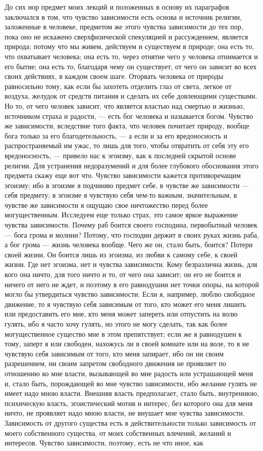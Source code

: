 \documentclass[12pt]{article}
\begin{document}
До сих нор предмет моих лекций и положенных в основу их параграфов заключался в том, что чувство зависимости есть основа и источник религии, заложенные в человеке, предметом же этого чувства зависимости до тех пор, пока оно не искажено сверхфизической спекуляцией и рассуждением, является природа; потому что мы живем, действуем и существуем в природе; она есть то, что охватывает человека; она есть то, через отнятие чего у человека отнимается и его бытие; она есть то, благодаря чему он существует, от чего он зависит во всех своих действиях, в каждом своем шаге. Оторвать человека от природы равносильно тому, как если бы захотеть отделить глаз от света, легкое от воздуха, желудок от средств питания и сделать их себе довлеющими существами. Но то, от чего человек зависит, что  является властью над смертью и жизнью, источником страха и радости, --- есть бог человека и называется богом. Чувство же зависимости, вследствие того факта, что человек почитает природу, вообще бога только за его благодетельность, --- а если и за его вредоносность и распространяемый им ужас, то лишь для того, чтобы отвратить от себя эту его вредоносность, --- привело нас к эгоизму, как к последней скрытой основе религии. Для устранения недоразумений и для более глубокого обоснования этого предмета скажу еще вот что. Чувство зависимости кажется противоречащим эгоизму; ибо в эгоизме я подчиняю предмет себе, в чувстве же зависимости --- себя предмету; в эгоизме я чувствую себя чем-то важным, значительным, в чувстве же зависимости я ощущаю свое ничтожество перед более могущественным. Исследуем еще только страх, это самое яркое выражение чувства зависимости. Почему раб боится своего господина, первобытный человек --- бога грома и молнии? Потому, что господин держит в своих руках жизнь раба, а бог грома --- жизнь человека вообще. Чего же он, стало быть, боится? Потери своей жизни. Он боится лишь из эгоизма, из любви к самому себе, к своей жизни. Где нет эгоизма, нет и чувства зависимости. Кому безразлична жизнь, для кого она ничто, для того ничто и то, от чего она зависит; он его не боится и ничего от него не ждет, и поэтому в его равнодушии нет точки опоры, на которой могло бы утвердиться чувство зависимости. Если я, например, люблю свободное движение, то я чувствую себя зависимым от того, кто может его меня лишить или предоставить его мне, кто меня может запереть или отпустить на волю гулять, ибо я часто хочу гулять, но этого не могу сделать, так как более могущественное существо мне в этом препятствует; если же я равнодушен к тому, заперт я или свободен, нахожусь ли в своей комнате или на воле, то я не чувствую себя зависимым от того, кто меня запирает, ибо он ни своим разрешением, ни своим запретом свободного движения не проявляет по отношению ко мне власти, вызывающей во мне радость или устрашающей меня и, стало быть, порождающей во мне чувство зависимости, ибо желание гулять не имеет надо мною власти. Внешняя власть предполагает, стало быть, внутреннюю, психическую власть, эгоистический мотив и интерес, без которого она для меня ничто, не проявляет надо мною власти, не внушает мне чувства зависимости. Зависимость от другого существа есть в действительности только зависимость от моего собственного существа, от моих собственных влечений, желаний и интересов. Чувство зависимости, поэтому, есть не что иное, как 
\end{document}

